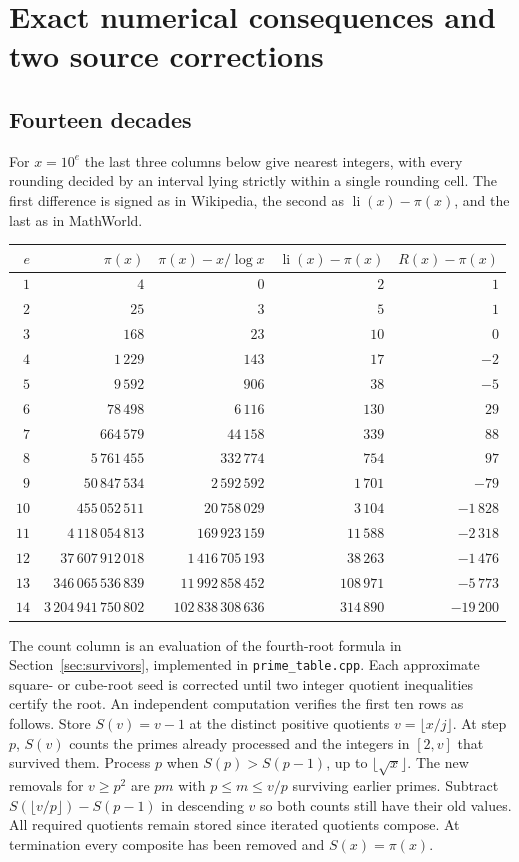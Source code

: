 \section{Exact numerical consequences and two source corrections}
\label{sec:cert}
\subsection{Fourteen decades}
For $x=10^e$ the last three columns below give nearest integers, with every rounding decided by an interval lying strictly within a single rounding cell. The first difference is signed as in Wikipedia, the second as $\operatorname{li}(x)-\pi(x)$, and the last as in MathWorld.
\begin{center}
\begin{tabular}{r r r r r}
\toprule
$e$ & $\pi(x)$ & $\pi(x)-x/\log x$ & $\operatorname{li}(x)-\pi(x)$ & $R(x)-\pi(x)$\\
\midrule
$1$ & $4$ & $0$ & $2$ & $1$ \\
$2$ & $25$ & $3$ & $5$ & $1$ \\
$3$ & $168$ & $23$ & $10$ & $0$ \\
$4$ & $1\,229$ & $143$ & $17$ & $-2$ \\
$5$ & $9\,592$ & $906$ & $38$ & $-5$ \\
$6$ & $78\,498$ & $6\,116$ & $130$ & $29$ \\
$7$ & $664\,579$ & $44\,158$ & $339$ & $88$ \\
$8$ & $5\,761\,455$ & $332\,774$ & $754$ & $97$ \\
$9$ & $50\,847\,534$ & $2\,592\,592$ & $1\,701$ & $-79$ \\
$10$ & $455\,052\,511$ & $20\,758\,029$ & $3\,104$ & $-1\,828$ \\
$11$ & $4\,118\,054\,813$ & $169\,923\,159$ & $11\,588$ & $-2\,318$ \\
$12$ & $37\,607\,912\,018$ & $1\,416\,705\,193$ & $38\,263$ & $-1\,476$ \\
$13$ & $346\,065\,536\,839$ & $11\,992\,858\,452$ & $108\,971$ & $-5\,773$ \\
$14$ & $3\,204\,941\,750\,802$ & $102\,838\,308\,636$ & $314\,890$ & $-19\,200$ \\
\bottomrule
\end{tabular}
\end{center}
The count column is an evaluation of the fourth-root formula in Section~\ref{sec:survivors}, implemented in \texttt{prime\_table.cpp}. Each approximate square- or cube-root seed is corrected until two integer quotient inequalities certify the root. An independent computation verifies the first ten rows as follows. Store $S(v)=v-1$ at the distinct positive quotients $v=\lfloor x/j\rfloor$. At step $p$, $S(v)$ counts the primes already processed and the integers in $[2,v]$ that survived them. Process $p$ when $S(p)>S(p-1)$, up to $\lfloor\sqrt{x}\rfloor$. The new removals for $v\ge p^2$ are $pm$ with $p\le m\le v/p$ surviving earlier primes. Subtract $S(\lfloor v/p\rfloor)-S(p-1)$ in descending $v$ so both counts still have their old values. All required quotients remain stored since iterated quotients compose. At termination every composite has been removed and $S(x)=\pi(x)$.

